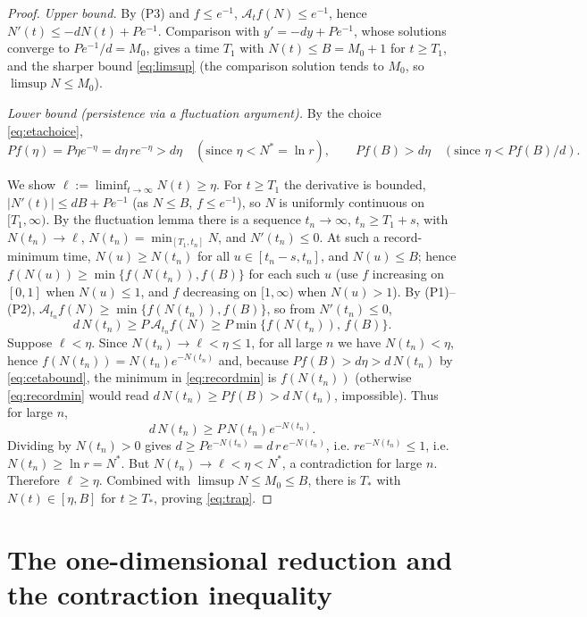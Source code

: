 \documentclass[12pt]{article}
\theoremstyle{definition}
\begin{document}
\begin{proof}
\emph{Upper bound.} By (P3) and $f\le e^{-1}$, $\mathcal A_tf(N)\le e^{-1}$,
hence $N'(t)\le -dN(t)+Pe^{-1}$. Comparison with $y'=-dy+Pe^{-1}$, whose
solutions converge to $Pe^{-1}/d=M_0$, gives a time $T_1$ with $N(t)\le B=M_0+1$
for $t\ge T_1$, and the sharper bound \eqref{eq:limsup} (the comparison solution
tends to $M_0$, so $\limsup N\le M_0$).

\emph{Lower bound (persistence via a fluctuation argument).} By the choice
\eqref{eq:etachoice},
\begin{equation}\label{eq:cetabound}
  Pf(\eta)=P\eta e^{-\eta}=d\eta\,re^{-\eta}>d\eta
  \quad(\text{since }\eta<N^*=\ln r),\qquad
  Pf(B)>d\eta\quad(\text{since }\eta<Pf(B)/d).
\end{equation}

We show $\ell:=\liminf_{t\to\infty}N(t)\ge\eta$. For $t\ge T_1$ the
derivative is bounded, $|N'(t)|\le dB+Pe^{-1}$ (as $N\le B$, $f\le e^{-1}$),
so $N$ is uniformly continuous on $[T_1,\infty)$. By the fluctuation lemma there
is a sequence $t_n\to\infty$, $t_n\ge T_1+s$, with
$N(t_n)\to\ell$, $N(t_n)=\min_{[T_1,t_n]}N$, and $N'(t_n)\le0$. At such a
record-minimum time, $N(u)\ge N(t_n)$ for all $u\in[t_n-s,t_n]$, and
$N(u)\le B$; hence
$f(N(u))\ge\min\{f(N(t_n)),f(B)\}$ for each such $u$ (use $f$ increasing on
$[0,1]$ when $N(u)\le1$, and $f$ decreasing on $[1,\infty)$ when $N(u)>1$). By
(P1)--(P2), $\mathcal A_{t_n}f(N)\ge\min\{f(N(t_n)),f(B)\}$, so from
$N'(t_n)\le0$,
\begin{equation}\label{eq:recordmin}
  d\,N(t_n)\ge P\,\mathcal A_{t_n}f(N)\ge P\min\{f(N(t_n)),\,f(B)\}.
\end{equation}
Suppose $\ell<\eta$. Since $N(t_n)\to\ell<\eta\le1$, for all large $n$ we have
$N(t_n)<\eta$, hence $f(N(t_n))=N(t_n)e^{-N(t_n)}$ and, because
$Pf(B)>d\eta>d\,N(t_n)$ by \eqref{eq:cetabound}, the minimum in
\eqref{eq:recordmin} is $f(N(t_n))$ (otherwise \eqref{eq:recordmin} would read
$d\,N(t_n)\ge Pf(B)>d\,N(t_n)$, impossible). Thus for large $n$,
\[
  d\,N(t_n)\ge P\,N(t_n)e^{-N(t_n)} .
\]
Dividing by $N(t_n)>0$ gives $d\ge Pe^{-N(t_n)}=d\,r\,e^{-N(t_n)}$, i.e.
$re^{-N(t_n)}\le1$, i.e. $N(t_n)\ge\ln r=N^*$. But $N(t_n)\to\ell<\eta<N^*$,
a contradiction for large $n$. Therefore $\ell\ge\eta$. Combined with
$\limsup N\le M_0\le B$, there is $T_*$ with $N(t)\in[\eta,B]$ for $t\ge T_*$,
proving \eqref{eq:trap}.

\end{proof}

\section{The one-dimensional reduction and the contraction inequality}
\end{document}
